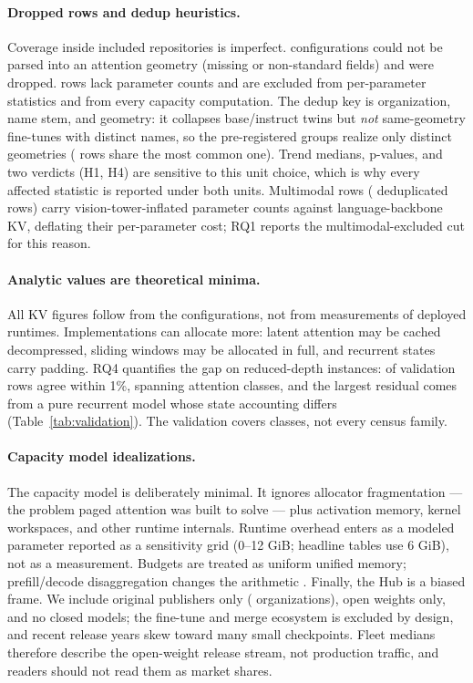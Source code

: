 \paragraph{Dropped rows and dedup heuristics.}
Coverage inside included repositories is imperfect. \kvcKvErrRows{}
configurations could not be parsed into an attention geometry (missing or
non-standard fields) and were dropped. \kvcNoParams{} rows lack parameter counts
and are excluded from per-parameter statistics and from every capacity
computation. The dedup key is organization, name stem, and geometry: it collapses base/instruct twins
but \emph{not} same-geometry fine-tunes with distinct names, so the
\kvcDedupRows{} pre-registered groups realize only \kvcGeoRows{} distinct
geometries (\kvcWorstGeoCluster{} rows share the most common one). Trend medians,
p-values, and two verdicts (H1, H4) are sensitive to this unit choice, which is why
every affected statistic is reported under both units. Multimodal rows (\kvcMMRows{}
deduplicated rows) carry vision-tower-inflated parameter counts against
language-backbone KV, deflating their per-parameter cost; RQ1 reports the
multimodal-excluded cut for this reason.

\paragraph{Analytic values are theoretical minima.}
All KV figures follow from the configurations, not from measurements of deployed
runtimes. Implementations can allocate more: latent attention may be cached
decompressed, sliding windows may be allocated in full, and recurrent states
carry padding. RQ4 quantifies the gap on reduced-depth instances:
\kvcValWithin{} of \kvcValRows{} validation rows agree within 1\%, spanning
\kvcValClasses{} attention classes, and the largest residual comes from a pure
recurrent model whose state accounting differs (Table~\ref{tab:validation}).
The validation covers classes, not every census family.

\paragraph{Capacity model idealizations.}
The capacity model is deliberately minimal. It ignores allocator fragmentation
--- the problem paged attention was built to solve \cite{kwon2023paged} ---
plus activation memory, kernel workspaces, and other runtime internals. Runtime
overhead enters as a modeled parameter reported as a sensitivity grid (0--12
GiB; headline tables use 6 GiB), not as a measurement. Budgets are treated as
uniform unified memory; prefill/decode disaggregation changes the arithmetic
\cite{zhong2024distserve}. Finally, the Hub is a biased frame. We include original
publishers only (\kvcOrgCount{} organizations), open weights only, and no closed
models; the fine-tune and merge ecosystem is excluded by design, and recent
release years skew toward many small checkpoints. Fleet medians therefore
describe the open-weight release stream, not production traffic, and readers
should not read them as market shares.
